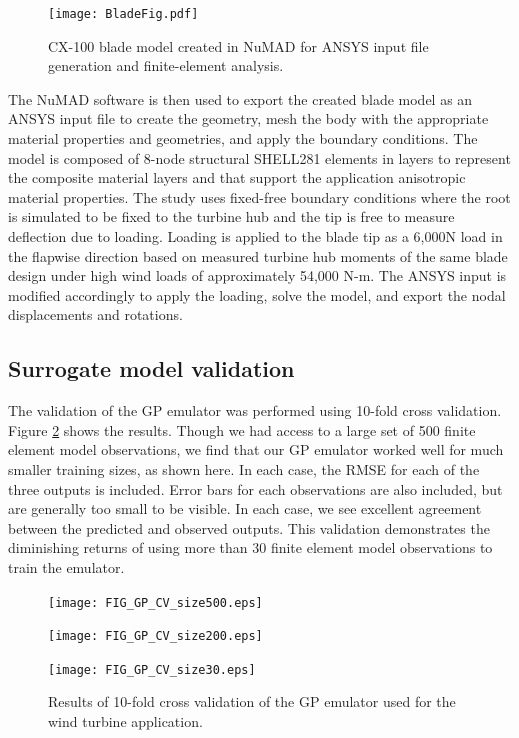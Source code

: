 \documentclass[twocolumn,10pt]{asme2ej}
\begin{document}
\begin{figure}[h]
	\centering
	\texttt{[image: BladeFig.pdf]}
	\caption{CX-100 blade model created in NuMAD for ANSYS input file generation and finite-element analysis.}
	\label{fig:bladeFig}
\end{figure}

The NuMAD software is then used to export the created blade model as an ANSYS input file to create the geometry, mesh the body with the appropriate material properties and geometries, and apply the boundary conditions. The model is composed of 8-node structural SHELL281 elements in layers to represent the composite material layers and that support the application anisotropic material properties. The study uses fixed-free boundary conditions where the root is simulated to be fixed to the turbine hub and the tip is free to measure deflection due to loading. Loading is applied to the blade tip as a 6,000N load in the flapwise direction based on measured turbine hub moments of the same blade design under high wind loads of approximately 54,000 N-m. The ANSYS input is modified accordingly to apply the loading, solve the model, and export the nodal displacements and rotations.

\subsection*{Surrogate model validation}
The validation of the GP emulator was performed using 10-fold cross validation.
Figure \ref{fig:gp_validation} shows the results. 
Though we had access to a large set of 500 finite element model observations, we find that our GP emulator worked well for much smaller training sizes, as shown here. 
In each case, the RMSE for each of the three outputs is included.
Error bars for each observations are also included, but are generally too small to be visible. In each case, we see excellent agreement between the predicted and observed outputs.
This validation demonstrates the diminishing returns of using more than 30 finite element model observations to train the emulator.
\begin{figure}
	\centering
	\texttt{[image: FIG\_GP\_CV\_size500.eps]}\vspace{1em}
	
	\texttt{[image: FIG\_GP\_CV\_size200.eps]}\vspace{1em}
	
	\texttt{[image: FIG\_GP\_CV\_size30.eps]}
	\caption{Results of 10-fold cross validation of the GP emulator used for the wind turbine application.}
	\label{fig:gp_validation}
\end{figure}
\end{document}
